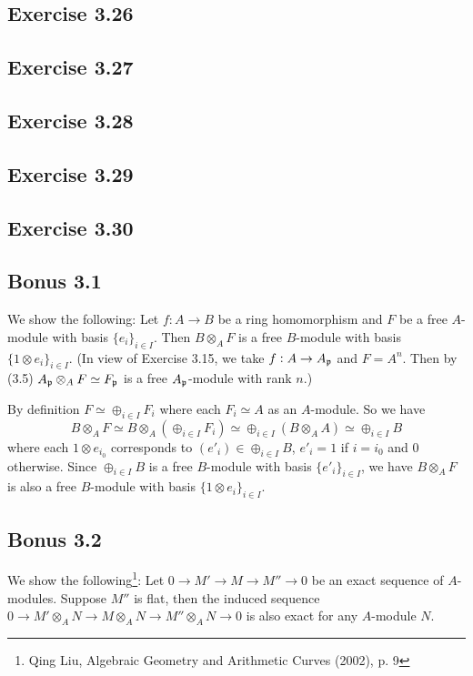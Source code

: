 \documentclass[../A&M.tex]{subfiles}
\begin{document}
\subsection*{Exercise 3.26}

\subsection*{Exercise 3.27}

\subsection*{Exercise 3.28}

\subsection*{Exercise 3.29}

\subsection*{Exercise 3.30}

\subsection*{Bonus 3.1} \label{Bonus 3.1}

We show the following: Let $f: A\to B$ be a ring homomorphism and $F$ be a free $A$-module with basis $\{e_i\}_{i\in I}$. Then $B \otimes_A F$ is a free $B$-module with basis $\{1 \otimes e_i\}_{i\in I}$. (In view of Exercise 3.15, we take $f: A \to A_{\mathfrak{p}}$ and $F=A^n$. Then by (3.5) $A_{\mathfrak{p}} \otimes_A F \simeq F_{\mathfrak{p}}$ is a free $A_{\mathfrak{p}}$-module with rank $n$.)

By definition $F \simeq \oplus_{i\in I} F_i$ where each $F_i \simeq A$ as an $A$-module. So we have
$$
B \otimes_A F \simeq B \otimes_A (\oplus_{i\in I} F_i) \simeq \oplus_{i\in I} (B \otimes_A A) \simeq \oplus_{i\in I} B
$$
where each $1 \otimes e_{i_0}$ corresponds to $(e'_i) \in \oplus_{i\in I} B$, $e'_i = 1$ if $i=i_0$ and $0$ otherwise. Since $\oplus_{i\in I} B$ is a free $B$-module with basis $\{e'_i\}_{i\in I}$, we have $B \otimes_A F$ is also a free $B$-module with basis $\{1 \otimes e_i\}_{i\in I}$.

\subsection*{Bonus 3.2} \label{Bonus 3.2}

We show the following\footnote{Qing Liu, Algebraic Geometry and
Arithmetic Curves (2002), p. 9}: Let $0 \to M' \to M \to M'' \to 0$ be an
exact sequence of $A$-modules. Suppose $M''$ is flat, then the induced sequence $0 \to M' \otimes_A N \to M \otimes_A N \to M'' \otimes_A N \to 0$ is also exact for any $A$-module $N$.
\end{document}
